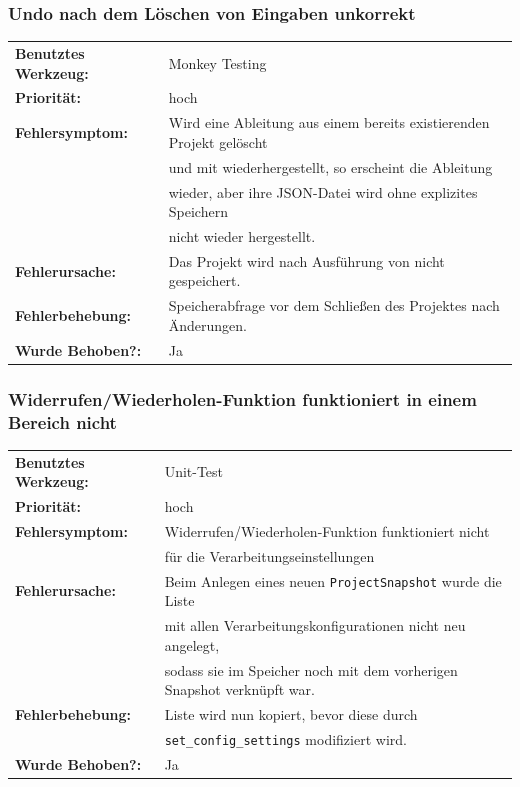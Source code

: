 \documentclass{article}
\newcommand{\guibutton}[1]{\fbox{\texttt{#1}}}
\begin{document}
\subsubsection*{Undo nach dem Löschen von Eingaben unkorrekt}
\begin{tabular}{ll}
    \textbf{Benutztes Werkzeug:} & Monkey Testing\\
    \textbf{Priorität:} & hoch\\
    \textbf{Fehlersymptom:} & Wird eine Ableitung aus einem bereits existierenden Projekt gelöscht\\
    &und mit \guibutton{Undo} wiederhergestellt, so erscheint die Ableitung \\
    &wieder, aber ihre JSON-Datei wird ohne explizites Speichern \\
    & nicht wieder hergestellt.\\
    \textbf{Fehlerursache:} & Das Projekt wird nach Ausführung von \guibutton{Undo} nicht gespeichert.\\
    \textbf{Fehlerbehebung:} & Speicherabfrage vor dem Schließen des Projektes nach Änderungen.\\
    \textbf{Wurde Behoben?:} & Ja\\
\end{tabular}

\subsubsection*{Widerrufen/Wiederholen-Funktion funktioniert in einem Bereich nicht}
\begin{tabular}{ll}
    \textbf{Benutztes Werkzeug:} & Unit-Test\\
    \textbf{Priorität:} & hoch\\
    \textbf{Fehlersymptom:} & Widerrufen/Wiederholen-Funktion funktioniert nicht\\
    & für die Verarbeitungseinstellungen\\
    \textbf{Fehlerursache:} & Beim Anlegen eines neuen \texttt{ProjectSnapshot} wurde die Liste \\
    & mit allen Verarbeitungskonfigurationen nicht neu angelegt,\\
    & sodass sie im Speicher noch mit dem vorherigen Snapshot verknüpft war.\\
    \textbf{Fehlerbehebung:} & Liste wird nun kopiert, bevor diese durch\\
    & \texttt{set\_config\_settings} modifiziert wird.\\
    \textbf{Wurde Behoben?:} & Ja\\
\end{tabular}
\end{document}
